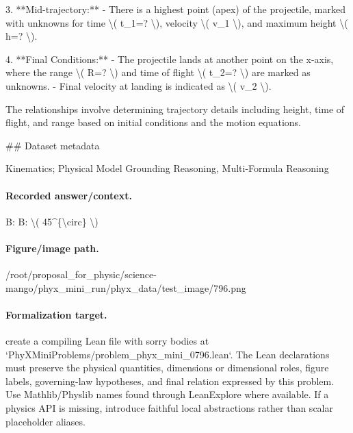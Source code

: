 3. **Mid-trajectory:**
   - There is a highest point (apex) of the projectile, marked with unknowns for time \textbackslash{}( t\_1=? \textbackslash{}), velocity \textbackslash{}( v\_1 \textbackslash{}), and maximum height \textbackslash{}( h=? \textbackslash{}).

4. **Final Conditions:**
   - The projectile lands at another point on the x-axis, where the range \textbackslash{}( R=? \textbackslash{}) and time of flight \textbackslash{}( t\_2=? \textbackslash{}) are marked as unknowns.
   - Final velocity at landing is indicated as \textbackslash{}( v\_2 \textbackslash{}).

The relationships involve determining trajectory details including height, time of flight, and range based on initial conditions and the motion equations.

\#\# Dataset metadata

Kinematics; Physical Model Grounding Reasoning, Multi-Formula Reasoning

\paragraph{Recorded answer/context.}
B: B: \textbackslash{}( 45\textasciicircum{}\{\textbackslash{}circ\} \textbackslash{})

\paragraph{Figure/image path.}
/root/proposal\_for\_physic/science-mango/phyx\_mini\_run/phyx\_data/test\_image/796.png

\paragraph{Formalization target.}
create a compiling Lean file with sorry bodies at `PhyXMiniProblems/problem\_phyx\_mini\_0796.lean`. The Lean declarations must preserve the physical quantities, dimensions or dimensional roles, figure labels, governing-law hypotheses, and final relation expressed by this problem.
Use Mathlib/Physlib names found through LeanExplore where available. If a physics API is missing, introduce faithful local abstractions rather than scalar placeholder aliases.

